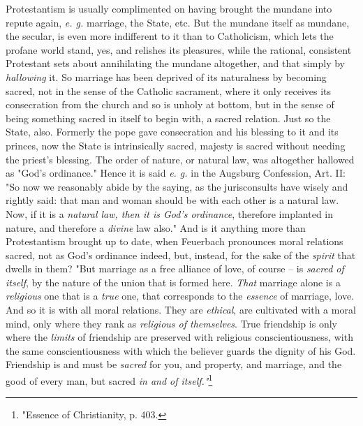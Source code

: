 \documentclass[a4paper]{book}
\begin{document}
Protestantism is usually complimented on having brought the mundane into 
repute again, \textit{e. g.} marriage, the State, etc. But the mundane itself 
as mundane, the secular, is even more indifferent to it than to Catholicism, 
which lets the profane world stand, yes, and relishes its pleasures, while the 
rational, consistent Protestant sets about annihilating the mundane 
altogether, and that simply by \textit{hallowing} it. So marriage has been 
deprived of its naturalness by becoming sacred, not in the sense of the 
Catholic sacrament, where it only receives its consecration from the church 
and so is unholy at bottom, but in the sense of being something sacred in 
itself to begin with, a sacred relation. Just so the State, also. Formerly the 
pope gave consecration and his blessing to it and its princes, now the State 
is intrinsically sacred, majesty is sacred without needing the priest's 
blessing. The order of nature, or natural law, was altogether hallowed as 
"{}God's ordinance."{} Hence it is said \textit{e. g.} in the Augsburg 
Confession, Art. II: "{}So now we reasonably abide by the saying, as the 
jurisconsults have wisely and rightly said: that man and woman should be with 
each other is a natural law. Now, if it is a \textit{natural law, then it is 
God's ordinance}, therefore implanted in nature, and therefore a 
\textit{divine} law also."{} And is it anything more than Protestantism 
brought up to date, when Feuerbach pronounces moral relations sacred, not as 
God's ordinance indeed, but, instead, for the sake of the \textit{spirit} that 
dwells in them? "{}But marriage as a free alliance of love, of course -- is 
\textit{sacred of itself}, by the nature of the union that is formed here. 
\textit{That} marriage alone is a \textit{religious} one that is a 
\textit{true} one, that corresponds to the \textit{essence} of marriage, love. 
And so it is with all moral relations. They are \textit{ethical}, are 
cultivated with a moral mind, only where they rank as \textit{religious of 
themselves}. True friendship is only where the \textit{limits} of friendship 
are preserved with religious conscientiousness, with the same 
conscientiousness with which the believer guards the dignity of his God. 
Friendship is and must be \textit{sacred} for you, and property, and marriage, 
and the good of every man, but sacred \textit{in and of 
itself."{}}\footnote{"{}Essence of Christianity, p. 403.}
\end{document}
